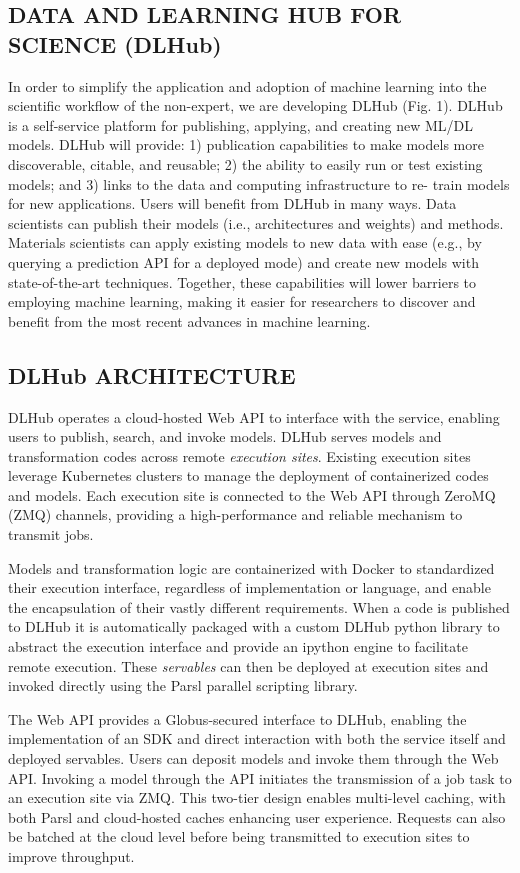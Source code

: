 \documentclass{aip-cp}
\begin{document}
\subsection{DATA AND LEARNING HUB FOR SCIENCE (DLHub)}


In order to simplify the application and adoption of machine learning into the
scientific workflow of the non-expert, we are developing DLHub (Fig. 1). DLHub
is a self-service platform for publishing, applying, and creating new ML/DL
models. DLHub will provide: 1) publication capabilities to make models more
discoverable, citable, and reusable; 2) the ability to easily run or test
existing models; and 3) links to the data and computing infrastructure to re-
train models for new applications. Users will benefit from DLHub in many ways.
Data scientists can publish their models (i.e., architectures and weights) and
methods. Materials scientists can apply existing models to new data with ease
(e.g., by querying a prediction API for a deployed mode) and create new models
with state-of-the-art techniques. Together, these capabilities will lower
barriers to employing machine learning, making it easier for researchers to
discover and benefit from the most recent advances in machine learning.

\subsection{DLHub ARCHITECTURE}
DLHub operates a cloud-hosted Web API to interface with the 
service, enabling users to publish, search, and invoke models. DLHub serves models and 
transformation codes across remote \textit{execution 
sites}. Existing execution sites leverage Kubernetes clusters to manage the deployment of 
containerized codes and models. Each execution site is connected to the Web API 
through ZeroMQ (ZMQ) channels, providing a high-performance and reliable mechanism to transmit 
jobs. 

Models and transformation logic are containerized with Docker to standardized their execution 
interface, regardless of implementation or language, and enable the encapsulation of their vastly 
different requirements. When a code is published to DLHub it is automatically packaged with 
a custom DLHub python library to abstract the execution interface and provide an ipython engine to 
facilitate remote execution. These \textit{servables} can then be deployed at execution sites 
and invoked directly using the Parsl parallel scripting library.

The Web API provides a Globus-secured interface to DLHub, enabling the implementation 
of an SDK and direct interaction with both the service itself and deployed servables. Users can 
deposit models and invoke them through the Web API. Invoking a model through the API initiates the 
transmission of a job task to an execution site via ZMQ. This two-tier design enables multi-level 
caching, with both Parsl and cloud-hosted caches enhancing user experience. Requests can also be 
batched at the cloud level before being transmitted to execution sites to improve throughput.
\end{document}
